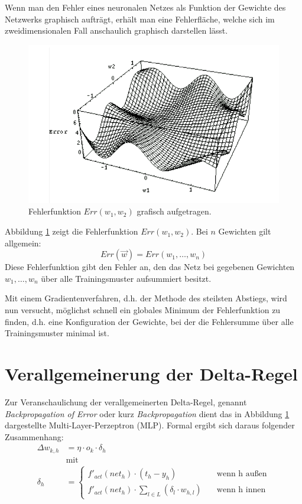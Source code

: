 Wenn man den Fehler eines neuronalen Netzes als Funktion der Gewichte des Netzwerks graphisch aufträgt, erhält man eine Fehlerfläche, welche sich im zweidimensionalen Fall anschaulich graphisch darstellen lässt.

\begin{figure}[ht!] \centering 
	\includegraphics[width=\linewidth]{figures/ch03_fehlerflaeche.pdf}
	\caption{Fehlerfunktion $Err(w_1, w_2)$ grafisch aufgetragen.}
	\label{fig:ch03_fehlerflaeche}
\end{figure}

Abbildung \ref{fig:ch03_fehlerflaeche} zeigt die Fehlerfunktion $Err(w_1, w_2)$. Bei $n$ Gewichten gilt allgemein:
\[
	Err(\vec{w}) = Err(w_1, \ldots, w_n)
\]
Diese Fehlerfunktion gibt den Fehler an, den das Netz bei gegebenen Gewichten $w_1, \ldots, w_n$ über alle Trainingsmuster aufsummiert besitzt.

Mit einem Gradientenverfahren, d.h. der Methode des steilsten Abstiegs, wird nun versucht, möglichst schnell ein globales Minimum der Fehlerfunktion zu finden, d.h. eine Konfiguration der Gewichte, bei der die Fehlersumme über alle Trainingsmuster minimal ist.



\section*{Verallgemeinerung der Delta-Regel}
Zur Veranschaulichung der verallgemeinerten Delta-Regel, genannt \emph{Backpropagation of Error} oder kurz \emph{Backpropagation} dient das in Abbildung \ref{fig:ch03_fehlerflaeche} dargestellte Multi-Layer-Perzeptron (MLP).
Formal ergibt sich daraus folgender Zusammenhang:
\begin{align*}
	\Delta w_{k,h} &= \eta \cdot o_k \cdot \delta_h \\
	&\text{mit} \\
	\delta_h &=
	\begin{cases}
		f'_{act}(net_h) \cdot (t_h - y_h) 
		\quad &\text{wenn h außen} \\
		f'_{act}(net_h) \cdot \sum_{l \in L} (\delta_l \cdot w_{h,l})
		\quad &\text{wenn h innen}
	\end{cases}
\end{align*}

